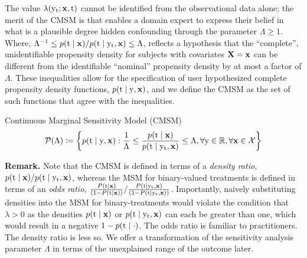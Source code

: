The value $\lambda(\mathrm{y}_{\mathrm{t}}; \mathbf{x}, \mathrm{t})$ cannot be identified from the observational data alone; the merit of the CMSM is that enables a domain expert to express their belief in what is a plausible degree hidden confounding through the parameter $\Lambda \geq 1$. Where, $\Lambda^{-1} \leq p(\mathrm{t} \mid \mathbf{x}) / p(\mathrm{t} \mid \mathrm{y}_{\mathrm{t}}, \mathbf{x}) \leq \Lambda$,
reflects a hypothesis that the ``complete'', unidentifiable propensity density for subjects with covariates $\mathbf{X}=\mathbf{x}$ can be different from the identifiable ``nominal'' propensity density by at most a factor of $\Lambda$.
These inequalities allow for the specification of user hypothesized complete propensity density functions, $p(\mathrm{t} \mid \mathrm{y}, \mathbf{x})$, and we define the CMSM as the set of such functions that agree with the inequalities.
\begin{definition}
    Continuous Marginal Sensitivity Model (CMSM)
    \begin{equation}
        \mathcal{P}(\Lambda) \coloneqq \left\{ p(\mathrm{t} \mid \mathrm{y}, \mathbf{x}): \frac{1}{\Lambda} \leq \frac{p(\mathrm{t} \mid \mathbf{x})}{p(\mathrm{t} \mid \mathrm{y}_{\mathrm{t}}, \mathbf{x})} \leq \Lambda, \forall \mathrm{y} \in \mathbb{R}, \forall \mathbf{x} \in \mathcal{X} \right\}
    \end{equation}
\end{definition}

\textbf{Remark.} Note that the CMSM is defined in terms of a \emph{density ratio}, $p(\mathrm{t} \mid \mathbf{x}) / p(\mathrm{t} \mid \mathrm{y}_{\mathrm{t}}, \mathbf{x})$, whereas the MSM for binary-valued treatments is defined in terms of an \emph{odds ratio}, $\frac{P(\mathrm{t} \mid \mathbf{x})}{(1 - P(\mathrm{t} \mid \mathbf{x}))} / \frac{P(\mathrm{t} \mid \mathrm{y}_{\mathrm{t}}, \mathbf{x})}{(1 - P(\mathrm{t} \mid \mathrm{y}_{\mathrm{t}}, \mathbf{x}))}$. 
Importantly, naively substituting densities into the MSM for binary-treatments would violate the condition that $\lambda>0$ as the densities $p(\mathrm{t} \mid \mathbf{x})$ or $p(\mathrm{t} \mid \mathrm{y}_{\mathrm{t}}, \mathbf{x})$ can each be greater than one, which would result in a negative $1 - p(\mathrm{t} \mid \cdot)$.
The odds ratio is familiar to practitioners. 
The density ratio is less so.
We offer a transformation of the sensitivity analysis parameter $\Lambda$ in terms of the unexplained range of the outcome later.